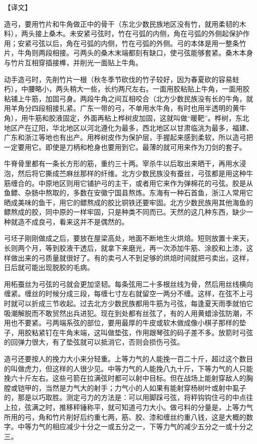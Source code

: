 \documentclass[12pt,UTF8]{ctexbook}
\begin{document}
【译文】

造弓，要用竹片和牛角做正中的骨干（东北少数民族地区没有竹，就用柔韧的木料），两头接上桑木。未安紧弓弦时，竹在弓弧的内侧，角在弓弧的外侧起保护作用；安紧弓弦以后，角在弓弧的内侧，竹在弓弧的外侧。弓的本体是用一整条竹片，牛角则两段相接。弓两头的桑木末端都刻有缺口，使弓弦能够套紧。桑木本身与竹片互相穿插接榫，并削光一面贴上牛角。

动手造弓时，先削竹片一根（秋冬季节砍伐的竹子较好，因为春夏砍的容易蛀朽），中腰略小，两头稍大一些，长约两尺左右。一面用胶粘贴上牛角，一面用胶粘铺上牛筋，加固弓身。两段牛角之间互相咬合（北方少数民族没有长的牛角，就用羊角分四段相接扎紧。广东一带的弓，不单用水牛角，有时也用半透明的黄牛角），用牛筋和胶液固定，外面再粘上桦树皮加固，这就叫做“暖靶”。桦树，东北地区产在辽阳，华北地区以河北遵化为最多，西北地区以甘肃临洮为最多，福建、广东和浙江等地也有出产。用桦树皮作为保护层，手握起来感到柔软，所以造弓把一定要用它。即使是刀柄和枪身也要用到它。最薄的就可用来作为刀剑的套子。

牛脊骨里都有一条长方形的筋，重约三十两。宰杀牛以后取出来晒干，再用水浸泡，然后将它撕成苎麻丝那样的纤维。北方少数民族没有蚕丝，弓弦都是用这种牛筋缠合的。中原地区则用它铺护弓的主干，或者用它来作为弹棉花的弓弦。胶是从鱼鳔、杂肠中熬取的，多数在安徽宁国县熬炼。东海有一种石首鱼，浙江人常用它晒成美味的鱼干，用它的鳔熬成的胶比铜铁还要牢固。北方少数民族用其他海鱼的鳔熬成的胶，同中原的一样牢固，只是种类不同而已。天然的这几种东西，缺少一种就造不成良弓，看来这并不是偶然的。

弓坯子刚刚做成之后，要放在屋梁高处，地面不断地生火烘焙。短则放置十来天，长则两个月，等到胶液干透后，就拿下来磨光，再一次添加牛筋、涂胶和上漆，这样做出来的弓质量就很好了。有的卖弓人不到足够的烘焙时间就把弓卖出，这样，日后就可能出现脱胶的毛病。

用柘蚕丝为弓弦的弓就会更加坚韧。每条弦用二十多根丝线为骨，然后用丝线横向缠紧。缠丝的时候分成三段，每缠七寸左右就留空一两分不缠。这样，在弦不上弓时就可以折成三节收起。过去北方少数民族都用牛筋为弓弦，每逢夏天雨季就怕它吸潮解脱而不敢贸然出兵进犯。现在到处都有丝弦了，有的人用黄蜡涂弦防潮，不用也不要紧。弓两端系弦的部位，要用最厚的牛皮或软木做成像小棋子那样的垫子，用胶粘紧钉在牛角末端，这叫做垫弦，作用跟琴弦的码子差不多。放箭时弓弦的回弹力很大，有了垫弦就可以抵消它，否则会损伤弓弦。

造弓还要按人的挽力大小来分轻重。上等力气的人能挽一百二十斤，超过这个数目的叫做虎力，但这样的人很少见。中等力气的人能挽八九十斤，下等力气的人只能挽六十斤左右。这些弓箭在拉满弦时都可以射中目标。但在战场上能射穿敌人的胸膛或铠甲的，当然是力气大的射手；力气小的人如果有能射穿杨树叶或射中虱子的，那是以巧取胜。测定弓力的方法是：可以用脚踩弓弦，将秤钩钩住弓的中点往上拉，弦满之时，推移秤锤称平，就可知道弓力大小。做弓料的分量是，上等力气所用的弓，角和竹片削好后约重七两，筋、胶、漆和缠丝约重八钱，这是大概的数字。中等力气的相应减少十分之一或五分之一，下等力气的减少五分之一或十分之三。
\end{document}
